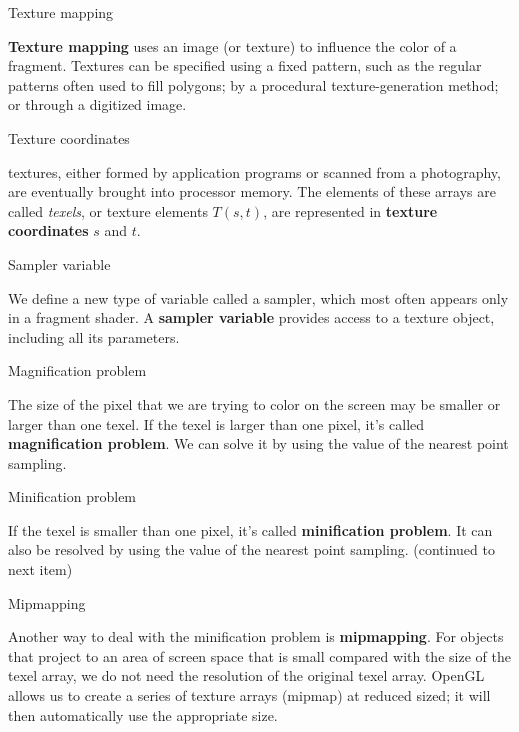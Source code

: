 \documentclass[10pt,a4paper]{article}
\begin{document}
\begin{enumerate}
		{\large \item Texture mapping}
		
		\textbf{Texture mapping} uses an image (or texture) to influence the color of a fragment. Textures can be specified using a fixed pattern, such as the regular patterns often used to fill polygons; by a procedural texture-generation method; or through a digitized image.\\
		
		{\large \item Texture coordinates}
		
		textures, either formed by application programs or scanned from a photography, are eventually brought into processor memory. The elements of these arrays are called \textit{texels}, or texture elements $ T(s, t) $, are represented in \textbf{texture coordinates} $ s $ and $ t $.\\
		
		{\large \item Sampler variable}
		
		We define a new type of variable called a sampler, which most often appears only in a fragment shader. A \textbf{sampler variable} provides access to a texture object, including all its parameters.\\
		
		{\large \item Magnification problem}
		
		The size of the pixel that we are trying to color on the screen may be smaller or larger than one texel. If the texel is larger than one pixel, it's called \textbf{magnification problem}. We can solve it by using the value of the nearest point sampling.\\
		
		{\large \item Minification problem}
		
		If the texel is smaller than one pixel, it's called \textbf{minification problem}. It can also be resolved by using the value of the nearest point sampling. (continued to next item)\\
		
		{\large \item Mipmapping}
		
		Another way to deal with the minification problem is \textbf{mipmapping}. For objects that project to an area of screen space that is small compared with the size of the texel array, we do not need the resolution of the original texel array. OpenGL allows us to create a series of texture arrays (mipmap) at reduced sized; it will then automatically use the appropriate size.\\
		

\end{enumerate}
\end{document}

